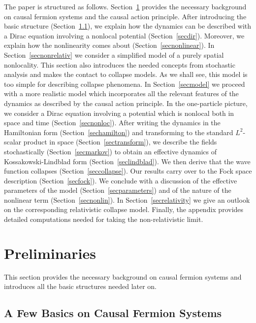 \documentclass[reqno,11pt]{amsart}
\numberwithin{equation}{section}
\newcommand{\1}{\mathds{1}}
\begin{document}
The paper is structured as follows. Section~\ref{secprelim} provides the necessary background on
causal fermion systems and the causal action principle. After introducing the basic
structure (Section~\ref{seccfs}), we explain how the dynamics can be described with
a Dirac equation involving a nonlocal potential (Section~\ref{secdir}). Moreover, we explain
how the nonlinearity comes about (Section~\ref{secnonlinear}).
In Section~\ref{secnonrelativ} we consider a simplified model of
a purely spatial nonlocality. This section also introduces the needed concepts from stochastic analysis
and makes the contact to collapse models. As we shall see, this model is too simple for describing
collapse phenomena. In Section~\ref{secmodel} we proceed with a more realistic model which incorporates
all the relevant features of the dynamics as described by the causal action principle.
In the one-particle picture, we consider a Dirac equation involving a potential which is nonlocal both in space
and time (Section~\ref{secnonloc}). After writing the dynamics in the Hamiltonian form (Section~\ref{sechamilton})
and transforming to the standard $L^2$-scalar product in space (Section~\ref{sectransform}),
we describe the fields stochastically (Section~\ref{secmarkov}) to obtain an effective dynamics of
Kossakowski-Lindblad form (Section~\ref{seclindblad}).
We then derive that the wave function collapses (Section~\ref{seccollapse}).
Our results carry over to the Fock space description (Section~\ref{secfock}).
We conclude with a discussion of the effective parameters of the model (Section~\ref{secparameters})
and of the nature of the nonlinear term (Section~\ref{secnonlin}).
In Section~\ref{secrelativity} we give an outlook on the corresponding relativistic collapse model.
Finally, the appendix provides detailed computations needed for taking the non-relativistic limit.



\section{Preliminaries} \label{secprelim}
This section provides the necessary background on causal fermion systems
and introduces all the basic structures needed later on.

\subsection{A Few Basics on Causal Fermion Systems} \label{seccfs}
\end{document}
